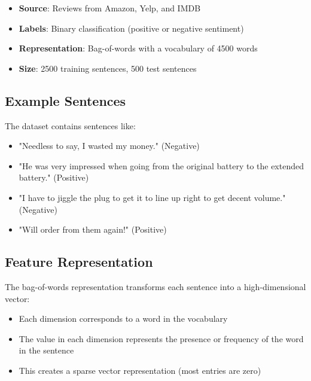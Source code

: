 \documentclass{article}
\begin{document}
\begin{itemize}
    \item \textbf{Source}: Reviews from Amazon, Yelp, and IMDB
    \item \textbf{Labels}: Binary classification (positive or negative sentiment)
    \item \textbf{Representation}: Bag-of-words with a vocabulary of 4500 words
    \item \textbf{Size}: 2500 training sentences, 500 test sentences
\end{itemize}

\subsection{Example Sentences}
The dataset contains sentences like:

\begin{itemize}
    \item "Needless to say, I wasted my money." (Negative)
    \item "He was very impressed when going from the original battery to the extended battery." (Positive)
    \item "I have to jiggle the plug to get it to line up right to get decent volume." (Negative)
    \item "Will order from them again!" (Positive)
\end{itemize}

\subsection{Feature Representation}
The bag-of-words representation transforms each sentence into a high-dimensional vector:

\begin{itemize}
    \item Each dimension corresponds to a word in the vocabulary
    \item The value in each dimension represents the presence or frequency of the word in the sentence
    \item This creates a sparse vector representation (most entries are zero)
\end{itemize}
\end{document}
